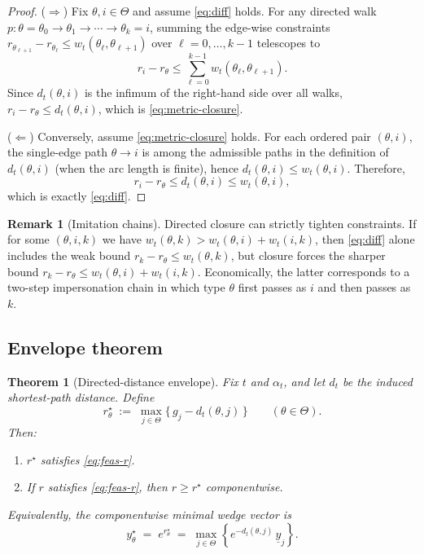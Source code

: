 \documentclass[final,3p,times]{elsarticle}
\theoremstyle{plain}
\newtheorem{theorem}{Theorem}
\theoremstyle{definition}
\newtheorem{remark}{Remark}
\newcommand{\1}{\mathbbm{1}}
\newcommand{\ThetaSet}{\Theta}
\begin{document}
\begin{proof}
($\Rightarrow$) Fix $\theta,i\in\ThetaSet$ and assume \eqref{eq:diff} holds.
For any directed walk $p:\theta=\theta_0\to\theta_1\to\cdots\to\theta_k=i$, summing the edge-wise
constraints $r_{\theta_{\ell+1}}-r_{\theta_\ell}\le w_t(\theta_\ell,\theta_{\ell+1})$ over $\ell=0,\dots,k-1$ telescopes to
\[
r_i-r_\theta \le \sum_{\ell=0}^{k-1} w_t(\theta_\ell,\theta_{\ell+1}).
\]
Since $d_t(\theta,i)$ is the infimum of the right-hand side over all walks, $r_i-r_\theta\le d_t(\theta,i)$, which is \eqref{eq:metric-closure}.

($\Leftarrow$) Conversely, assume \eqref{eq:metric-closure} holds. For each ordered pair $(\theta,i)$,
the single-edge path $\theta\to i$ is among the admissible paths in the definition of $d_t(\theta,i)$ (when the
arc length is finite), hence $d_t(\theta,i)\le w_t(\theta,i)$. Therefore,
\[
r_i-r_\theta \le d_t(\theta,i)\le w_t(\theta,i),
\]
which is exactly \eqref{eq:diff}.
\end{proof}

\begin{remark}[Imitation chains]\label{rem:imitation-chains}
Directed closure can strictly tighten constraints. If for some $(\theta,i,k)$ we have
$w_t(\theta,k)>w_t(\theta,i)+w_t(i,k)$, then \eqref{eq:diff} alone includes the weak bound
$r_k-r_\theta\le w_t(\theta,k)$, but closure forces the sharper bound
$r_k-r_\theta\le w_t(\theta,i)+w_t(i,k)$.
Economically, the latter corresponds to a two-step impersonation chain in which type $\theta$ first passes as $i$ and then passes as $k$.
\end{remark}

\subsection{Envelope theorem}

\begin{theorem}[Directed-distance envelope]\label{thm:envelope}
Fix $t$ and $\alpha_t$, and let $d_t$ be the induced shortest-path distance. Define
\begin{equation}\label{eq:envelope-r}
r^\star_\theta \;:=\; \max_{j\in\ThetaSet}\{\, g_j - d_t(\theta,j)\,\}\qquad (\theta\in\ThetaSet).
\end{equation}
Then:
\begin{enumerate}[label=(\roman*)]
\item $r^\star$ satisfies \eqref{eq:feas-r}.
\item If $r$ satisfies \eqref{eq:feas-r}, then $r\ge r^\star$ componentwise.
\end{enumerate}
Equivalently, the componentwise minimal wedge vector is
\begin{equation}\label{eq:envelope-y}
y^\star_\theta \;=\; e^{r^\star_\theta}
\;=\; \max_{j\in\ThetaSet}\left\{e^{-d_t(\theta,j)}\,\underline y_j\right\}.
\end{equation}
\end{theorem}
\end{document}
